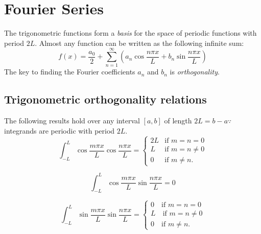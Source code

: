 \pagebreak
\section{Fourier Series}
The trigonometric functions form a \textit{basis} for the space of periodic functions with period $2L$. Almost
any function can be written as the following infinite sum:
\begin{equation*}
    f(x) = \frac{a_0}{2} + \sum_{n=1}^{\infty}\left(a_n \cos\frac{n\pi x}{L} + b_n \sin \frac{n \pi x}{L}\right)
\end{equation*}
The key to finding the Fourier coefficients $a_n$ and $b_n$ is \textit{orthogonality}.

\subsection*{Trigonometric orthogonality relations}
The following results hold over any interval $[a,b]$ of length $2L = b - a \because$ integrands are periodic
with period $2L$.
\begin{equation*}
    \int_{-L}^{L} \cos \frac{m \pi x}{L} \cos \frac{n \pi x}{L} = \begin{cases}
        2L &\textrm{if } m = n = 0 \\
        L  &\textrm{if } m = n \neq 0 \\
        0  &\textrm{if } m \neq n.
    \end{cases}
\end{equation*}

\begin{equation*}
    \int_{-L}^{L} \cos \frac{m \pi x}{L} \sin \frac{n \pi x}{L} = 0
\end{equation*}

\begin{equation*}
    \int_{-L}^{L} \sin \frac{m \pi x}{L} \sin \frac{n \pi x}{L}   = \begin{cases}
        0 \quad \textrm{if } m = n = 0 \\
        L \quad \textrm{if } m = n \neq 0 \\
        0 \quad \textrm{if } m \neq n.
    \end{cases}
\end{equation*}


